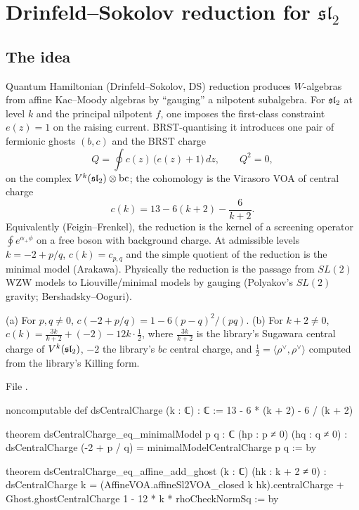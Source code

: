 \section{Drinfeld--Sokolov reduction for \texorpdfstring{$\mathfrak{sl}_2$}{sl(2)}}\label{l19:sec:ds}

\subsection{The idea}

Quantum Hamiltonian (Drinfeld--Sokolov, DS) reduction produces $W$-algebras from affine Kac--Moody
algebras by ``gauging'' a nilpotent subalgebra. For $\mathfrak{sl}_2$ at level $k$ and the principal nilpotent
$f$, one imposes the first-class constraint $e(z) = 1$ on the raising current. BRST-quantising it introduces
one pair of fermionic ghosts $(b,c)$ and the BRST charge
\begin{equation*}
 Q = \oint c(z)\,\big(e(z)+1\big)\,dz,\qquad Q^2 = 0,
\end{equation*}
on the complex $V^k(\mathfrak{sl}_2)\otimes\mathrm{bc}$; the cohomology is the Virasoro VOA of central charge
\begin{equation*}
 c(k) = 13-6(k+2)-\frac{6}{k+2}.
\end{equation*}
Equivalently (Feigin--Frenkel), the reduction is the kernel of a screening operator
$\oint e^{\alpha_+\phi}$ on a free boson with background charge. At admissible levels $k = -2+p/q$,
$c(k) = c_{p,q}$ and the simple quotient of the reduction is the minimal model (Arakawa). Physically the
reduction is the passage from $SL(2)$ WZW models to Liouville/minimal models by gauging (Polyakov's
$SL(2)$ gravity; Bershadsky--Ooguri).

\begin{theorem}[DS arithmetic]\label{l19:thm:dsarith}
(a) For $p,q\ne0$, $c(-2+p/q) = 1-6(p-q)^2/(pq)$. (b) For $k+2\ne0$, $c(k) = \frac{3k}{k+2} + (-2) - 12k\cdot\frac12$,
where $\frac{3k}{k+2}$ is the library's Sugawara central charge of $V^k(\mathfrak{sl}_2)$, $-2$ the library's $bc$
central charge, and $\frac12 = \langle\rho^\vee,\rho^\vee\rangle$ computed from the library's Killing form.
\end{theorem}

\noindent File .
\begin{leancode}
noncomputable def dsCentralCharge (k : ℂ) : ℂ := 13 - 6 * (k + 2) - 6 / (k + 2)

theorem dsCentralCharge_eq_minimalModel {p q : ℂ} (hp : p ≠ 0) (hq : q ≠ 0) :
    dsCentralCharge (-2 + p / q) = minimalModelCentralCharge p q := by

theorem dsCentralCharge_eq_affine_add_ghost (k : ℂ) (hk : k + 2 ≠ 0) :
    dsCentralCharge k
      = (AffineVOA.affineSl2VOA_closed k hk).centralCharge
        + Ghost.ghostCentralCharge 1 - 12 * k * rhoCheckNormSq := by
\end{leancode}

